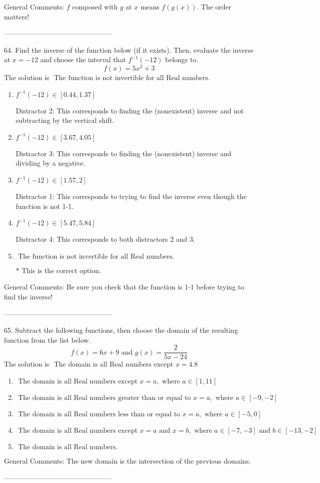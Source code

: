 \documentclass{extbook}[14pt]
\begin{document}
General Comments: $f$ composed with $g$ at $x$ means $f(g(x))$. The order matters!

-----------------------------------------------

64. Find the inverse of the function below (if it exists). Then, evaluate the inverse at $x = -12$ and choose the interval that $f^{-1}(-12)$ belongs to.
\[ f(x) = 5 x^2 + 3 \] 
The solution is $ \text{ The function is not invertible for all Real numbers. } $ 

\begin{enumerate}[label=\Alph*.] 
\item $ f^{-1}(-12) \in [0.44, 1.37] $ 

  Distractor 2: This corresponds to finding the (nonexistent) inverse and not subtracting by the vertical shift. 
\item $ f^{-1}(-12) \in [3.67, 4.05] $ 

  Distractor 3: This corresponds to finding the (nonexistent) inverse and dividing by a negative. 
\item $ f^{-1}(-12) \in [1.57, 2] $ 

  Distractor 1: This corresponds to trying to find the inverse even though the function is not 1-1.  
\item $ f^{-1}(-12) \in [5.47, 5.84] $ 

  Distractor 4: This corresponds to both distractors 2 and 3. 
\item $ \text{ The function is not invertible for all Real numbers. } $ 

 * This is the correct option. 
\end{enumerate} 
 
General Comments: Be sure you check that the function is 1-1 before trying to find the inverse!

-----------------------------------------------

65. Subtract the following functions, then choose the domain of the resulting function from the list below.
\[ f(x) = 6x + 9 \text{ and } g(x) = \frac{2}{5x-24} \] 
The solution is $ \text{ The domain is all Real numbers except } x = 4.8 $ 

\begin{enumerate}[label=\Alph*.] 
\item $ \text{ The domain is all Real numbers except } x = a, \text{ where } a \in [1, 11] $ 

  
\item $ \text{ The domain is all Real numbers greater than or equal to } x = a, \text{ where } a \in [-9, -2] $ 

  
\item $ \text{ The domain is all Real numbers less than or equal to } x = a, \text{ where } a \in [-5, 0] $ 

  
\item $ \text{ The domain is all Real numbers except } x = a \text{ and } x = b, \text{ where } a \in [-7, -3] \text{ and } b \in [-13, -2] $ 

  
\item $ \text{ The domain is all Real numbers. } $ 

  
\end{enumerate} 
 
General Comments: The new domain is the intersection of the previous domains.

-----------------------------------------------
\end{document}

